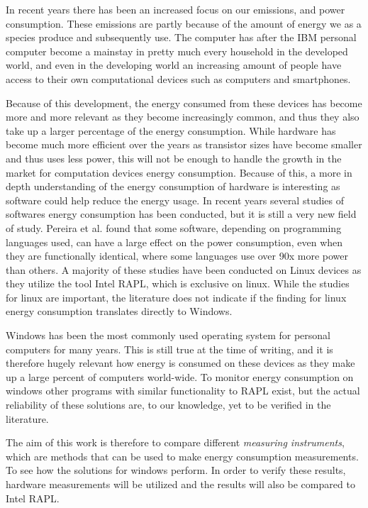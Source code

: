 In recent years there has been an increased focus on our emissions, and power consumption. These emissions are partly because of the amount of energy we as a species produce and subsequently use. 
The computer has after the IBM personal computer become a mainstay in pretty much every household in the developed world, and even in the developing world an increasing amount of people have access to their own computational devices such as computers and smartphones\cite{DevelopedWorldPC}. 

Because of this development, the energy consumed from these devices has become more and more relevant as they become increasingly common, and thus they also take up a larger percentage of the energy consumption. 
While hardware has become much more efficient over the years as transistor sizes have become smaller and thus uses less power, this will not be enough to handle the growth in the market for computation devices energy consumption. Because of this, a more in depth understanding of the energy consumption of hardware is interesting as software could help reduce the energy usage\cite{somavat2011energy}. 
In recent years several studies of softwares energy consumption has been conducted, but it is still a very new field of study. Pereira et al. found that some software, depending on programming languages used, can have a large effect on the power consumption, even when they are functionally identical, where some languages use over 90x more power than others.
A majority of these studies have been conducted on Linux devices as they utilize the tool Intel RAPL, which is exclusive on linux. While the studies for linux are important, the literature does not indicate if the finding for linux energy consumption translates directly to Windows\cite{Pereira2017}. 

Windows has been the most commonly used operating system for personal computers for many years. This is still true at the time of writing, and it is therefore hugely relevant how energy is consumed on these devices as they make up a large percent of computers world-wide\cite{OSShare}. To monitor energy consumption on windows other programs with similar functionality to RAPL exist, but the actual reliability of these solutions are, to our knowledge, yet to be verified in the literature.

The aim of this work is therefore to compare different \textit{measuring instruments}, which are methods that can be used to make energy consumption measurements\cite*{MANCEBO2021100558}. To see how the solutions for windows perform. 
In order to verify these results, hardware measurements will be utilized and the results will also be compared to Intel RAPL.

